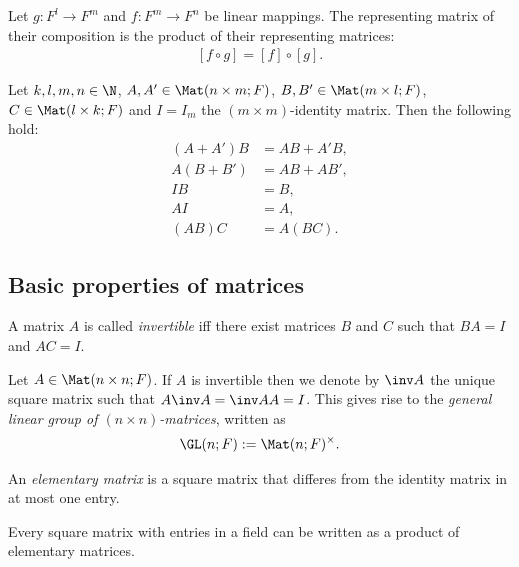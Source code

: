 \documentclass{article}
\begin{document}
\begin{theorem}[Theorem 2.1.8]
	Let $g:F^l\to F^m$ and $f:F^m\to F^n$ be linear mappings. The representing matrix
	of their composition is the product of their representing matrices:
	\begin{align*}
		\left[f\circ g\right]=\left[f\right]\circ\left[g\right].
	\end{align*}
\end{theorem}

\begin{proposition}[Proposition 2.1.9]
	Let $k,l,m,n\in\N$, $A,A'\in\Mat(n\times m;F)$, $B,B'\in\Mat(m\times l;F)$,
	$C\in\Mat(l\times k; F)$ and $I=I_m$ the $(m\times m)$-identity matrix.
	Then the following hold:
	\begin{align*}
		(A+A')B & = AB + A'B, \\
		A(B+B') & = AB + AB', \\
		IB      & = B,        \\
		AI      & = A,        \\
		(AB)C   & = A(BC).
	\end{align*}
\end{proposition}

\subsection{Basic properties of matrices}

\begin{definition}
	A matrix $A$ is called \emph{invertible} iff there exist matrices $B$ and $C$
	such that $BA=I$ and $AC=I$.
\end{definition}

\begin{definition}
	Let $A\in\Mat(n\times n;F)$. If $A$ is invertible then we denote by $\inv A$
	the unique square matrix such that $A\inv A=\inv AA=I$. This gives rise to the
	\emph{general linear group of $(n\times n)$-matrices}, written as
	\begin{align*}
		\GL(n;F) := \Mat(n;F)^\times.
	\end{align*}
\end{definition}

\begin{definition}
	An \emph{elementary matrix} is a square matrix that differes from the identity
	matrix in at most one entry.
\end{definition}

\begin{theorem}[Theorem 2.2.3]
	Every square matrix with entries in a field can be written as a product of
	elementary matrices.
\end{theorem}
\end{document}
